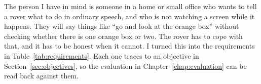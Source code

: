 \label{chap:design}


\label{sec:requirements}

The person I have in mind is someone in a home or small office who wants to
tell a rover what to do in ordinary speech, and who is not watching a screen
while it happens. They will say things like ``go and look at the orange box''
without checking whether there is one orange box or two. The rover has to cope
with that, and it has to be honest when it cannot. I turned this into the
requirements in Table~\ref{tab:requirements}. Each one traces to an objective in
Section~\ref{sec:objectives}, so the evaluation in Chapter~\ref{chap:evaluation}
can be read back against them.

